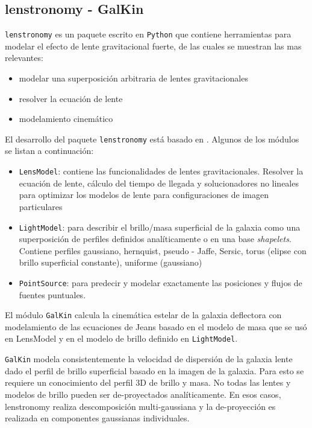 \subsection{lenstronomy - GalKin}

\verb+lenstronomy+ es un paquete escrito en \verb+Python+ que contiene herramientas para modelar el efecto de lente gravitacional fuerte, de las cuales se muestran las mas relevantes:

\begin{itemize}
\item modelar una superposición arbitraria de lentes gravitacionales
\item resolver la ecuación de lente
\item modelamiento cinemático
\end{itemize}

El desarrollo del paquete \verb+lenstronomy+ está basado en \cite{BI15}. Algunos de los módulos se listan a continuación:

\begin{itemize}
\item \verb+LensModel+: contiene las funcionalidades de lentes gravitacionales. Resolver la ecuación de lente, cálculo del tiempo de llegada y solucionadores no lineales para optimizar los modelos de lente para configuraciones de imagen particulares
\item \verb+LightModel+: para describir el brillo/masa superficial de la galaxia como una superposición de perfiles definidos analíticamente o en una base \emph{shapelets}. Contiene perfiles gaussiano, hernquist, pseudo - Jaffe, Sersic, torus (elipse con brillo superficial constante), uniforme (gaussiano)
\item \verb+PointSource+: para predecir y modelar exactamente las posiciones y flujos de fuentes puntuales.
\end{itemize}

El módulo \verb+GalKin+ calcula la cinemática estelar de la galaxia deflectora con modelamiento de las ecuaciones de Jeans basado en el modelo de masa que se usó en LensModel y en el modelo de brillo definido en \verb+LightModel+.

\verb+GalKin+ modela consistentemente la velocidad de dispersión de la galaxia lente dado el perfil de brillo superficial basado en la imagen de la galaxia. Para esto se requiere un conocimiento del perfil 3D de brillo y masa. No todas las lentes y modelos de brillo pueden ser de-proyectados analíticamente. En esos casos, lenstronomy realiza descomposición multi-gaussiana y la de-proyección es realizada en componentes gaussianas individuales.

